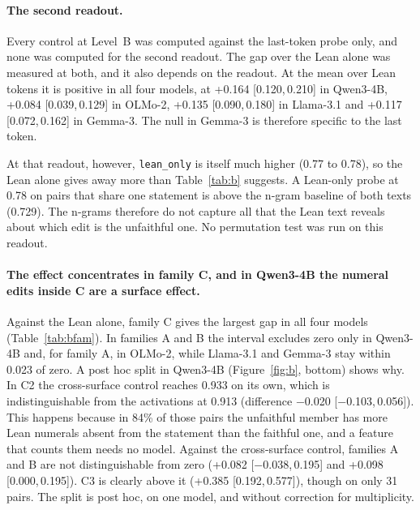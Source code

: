 \documentclass[10pt]{article}
\newcommand{\vr}[1]{\texttt{#1}}
\newcommand{\ic}[2]{[#1,\,#2]}
\begin{document}
\paragraph{The second readout.}
Every control at Level~B was computed against the last-token probe only, and none was computed for the second
readout. The gap over the Lean alone was measured at both, and it also depends on the readout. At the mean over
Lean tokens it is positive in all four models, at +0.164 \ic{0.120}{0.210} in Qwen3-4B, +0.084 \ic{0.039}{0.129} in
OLMo-2, +0.135 \ic{0.090}{0.180} in Llama-3.1 and +0.117 \ic{0.072}{0.162} in Gemma-3. The null in Gemma-3 is
therefore specific to the last token.

At that readout, however, \vr{lean\_only} is itself much higher (0.77 to 0.78), so the Lean alone gives away more
than Table~\ref{tab:b} suggests. A Lean-only probe at 0.78 on pairs that share one statement is above the n-gram
baseline of both texts (0.729). The n-grams therefore do not capture all that the Lean text reveals about which
edit is the unfaithful one. No permutation test was run on this readout.

\paragraph{The effect concentrates in family C, and in Qwen3-4B the numeral edits inside C are a surface effect.}
Against the Lean alone, family C gives the largest gap in all four models (Table~\ref{tab:bfam}). In families A and
B the interval excludes zero only in Qwen3-4B and, for family A, in OLMo-2, while Llama-3.1 and Gemma-3 stay within
0.023 of zero. A post hoc split in Qwen3-4B (Figure~\ref{fig:b}, bottom) shows why. In C2 the cross-surface
control reaches 0.933 on its own, which is indistinguishable from the activations at 0.913 (difference −0.020
\ic{−0.103}{0.056}). This happens because in 84\% of those pairs the unfaithful member has more Lean numerals
absent from the statement than the faithful one, and a feature that counts them needs no model. Against
the cross-surface control, families A and B are not distinguishable from zero (+0.082 \ic{−0.038}{0.195} and +0.098
\ic{0.000}{0.195}). C3 is clearly above it (+0.385 \ic{0.192}{0.577}), though on only 31 pairs. The split is
post hoc, on one model, and without correction for multiplicity.
\end{document}
